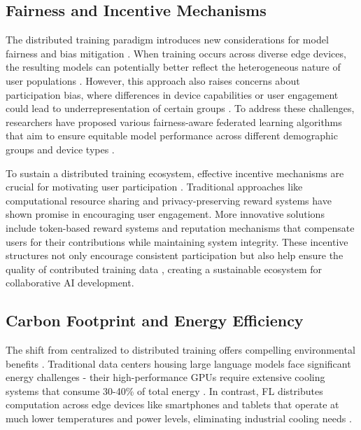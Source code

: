 \subsection{Fairness and Incentive Mechanisms}\label{subsec:fairness_and_incentive_mechanisms}

The distributed training paradigm introduces new considerations for model fairness and bias mitigation \cite{kheya2024pursuit,li2020fair}. When training occurs across diverse edge devices, the resulting models can potentially better reflect the heterogeneous nature of user populations \cite{wang2020optimizing}. However, this approach also raises concerns about participation bias, where differences in device capabilities or user engagement could lead to underrepresentation of certain groups \cite{kairouz2021advances}. To address these challenges, researchers have proposed various fairness-aware federated learning algorithms \cite{mohri2019agnostic} that aim to ensure equitable model performance across different demographic groups and device types \cite{li2020fair}.

To sustain a distributed training ecosystem, effective incentive mechanisms are crucial for motivating user participation \cite{kang2019incentive}. Traditional approaches like computational resource sharing \cite{khan2020federated} and privacy-preserving reward systems have shown promise in encouraging user engagement. More innovative solutions include token-based reward systems \cite{wang2023incentive} and reputation mechanisms \cite{yang2019federated} that compensate users for their contributions while maintaining system integrity. These incentive structures not only encourage consistent participation but also help ensure the quality of contributed training data \cite{sharghivand2020edge}, creating a sustainable ecosystem for collaborative AI development.

\subsection{Carbon Footprint and Energy Efficiency}\label{subsec:carbon_footprint_and_energy_efficiency}
The shift from centralized to distributed training offers compelling environmental benefits \cite{guidi2024environmental}. Traditional data centers housing large language models face significant energy challenges\cite{sarkar2024carbon} - their high-performance GPUs require extensive cooling systems that consume 30-40\% of total energy \cite{cooling}. In contrast, FL distributes computation across edge devices like smartphones and tablets that operate at much lower temperatures and power levels, eliminating industrial cooling needs \cite{fl_vs_centralized}.

